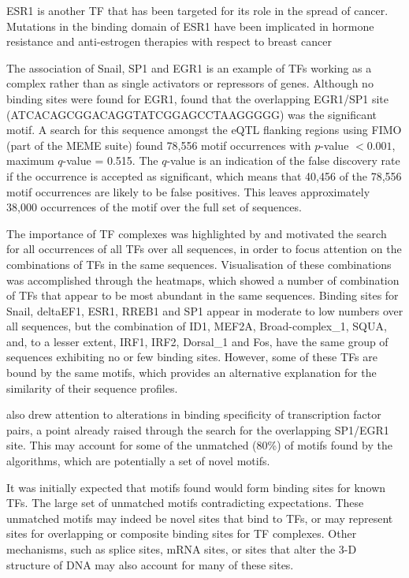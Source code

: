 \documentclass[12pt]{article}
\begin{document}
ESR1 is another TF that has been targeted for its role in the spread of cancer. Mutations in the binding domain of ESR1 have been implicated in hormone resistance and anti-estrogen therapies with respect to breast cancer \citep{Griffith2017}

The association of Snail, SP1 and EGR1 is an example of TFs working as a complex rather than as single activators or repressors of genes. Although no binding sites were found for EGR1, \citet{Hu2010} found that the overlapping EGR1/SP1 site (ATCACAGCGGACAGGTATCGGAGCCTAAGGGGG) was the significant motif. A search for this sequence amongst the eQTL flanking regions using FIMO (part of the MEME suite) \citep{Grant2011} found 78,556 motif occurrences with  $p$-value $< 0.001$, maximum $q$-value = 0.515. The $q$-value is an indication of the false discovery rate if the occurrence is accepted as significant, which means that 40,456 of the 78,556 motif occurrences are likely to be false positives. This leaves approximately 38,000 occurrences of the motif over the full set of sequences.

The importance of TF complexes was highlighted by \citet{Jolma2015} and motivated the search for all occurrences of all TFs over all sequences, in order to focus attention on the combinations of TFs in the same sequences. Visualisation of these combinations was accomplished through the heatmaps, which showed a number of combination of TFs that appear to be most abundant in the same sequences. Binding sites for Snail, deltaEF1,  ESR1, RREB1 and SP1 appear in moderate to low numbers over all sequences, but the combination of ID1, MEF2A, Broad-complex{\_}1, SQUA, and, to a lesser extent, IRF1, IRF2, Dorsal{\_}1 and Fos, have the same group of sequences exhibiting no or few binding sites. However, some of these TFs are bound by the same motifs, which provides an alternative explanation for the similarity of their sequence profiles. 

\citet{Jolma2015} also drew attention to alterations in binding specificity of transcription factor pairs, a point already raised through the search for the overlapping SP1/EGR1 site. This may account for some of the unmatched (80\%) of motifs found by the algorithms, which are potentially a set of novel motifs.

It was initially expected that motifs found would form binding sites for known TFs. The large set of unmatched motifs contradicting expectations. These unmatched motifs may indeed be novel sites that bind to TFs, or may represent sites for overlapping or composite binding sites for TF complexes. Other mechanisms, such as splice sites, mRNA sites, or sites that alter the 3-D structure of DNA may also account for many of these sites. 
\end{document}
